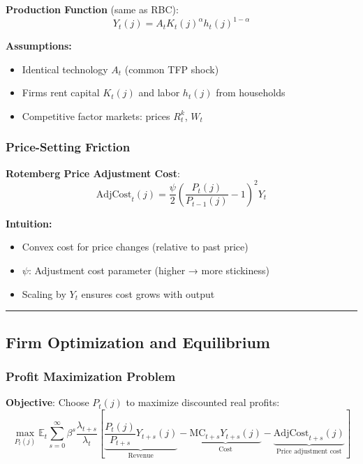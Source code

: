 \documentclass[11pt,preprint]{elsarticle}
\numberwithin{equation}{section}
\numberwithin{figure}{section}
\numberwithin{table}{section}
\def\tightlist{} %
\begin{document}
\textbf{Production Function} (same as RBC): \[
Y_t(j) = A_t K_t(j)^\alpha h_t(j)^{1-\alpha}
\]

\textbf{Assumptions:}

\begin{itemize}
\tightlist
\item
  Identical technology \(A_t\) (common TFP shock)
\item
  Firms rent capital \(K_t(j)\) and labor \(h_t(j)\) from households
\item
  Competitive factor markets: prices \(R_t^k\), \(W_t\)
\end{itemize}

\subsubsection{Price-Setting Friction}\label{price-setting-friction}

\textbf{Rotemberg Price Adjustment Cost}: \[
\text{AdjCost}_t(j) = \frac{\psi}{2} \left( \frac{P_t(j)}{P_{t-1}(j)} - 1 \right)^2 Y_t
\]

\textbf{Intuition:}

\begin{itemize}
\tightlist
\item
  Convex cost for price changes (relative to past price)
\item
  \(\psi\): Adjustment cost parameter (higher → more stickiness)
\item
  Scaling by \(Y_t\) ensures cost grows with output
\end{itemize}

\begin{center}\rule{0.5\linewidth}{0.5pt}\end{center}

\subsection{Firm Optimization and
Equilibrium}\label{firm-optimization-and-equilibrium}

\subsubsection{Profit Maximization
Problem}\label{profit-maximization-problem}

\textbf{Objective}: Choose \(P_t(j)\) to maximize discounted real
profits: \[
\max_{P_t(j)} \mathbb{E}_t \sum_{s=0}^\infty \beta^s \frac{\lambda_{t+s}}{\lambda_t} \left[
\underbrace{\frac{P_t(j)}{P_{t+s}} Y_{t+s}(j)}_{\text{Revenue}} - 
\underbrace{\text{MC}_{t+s} Y_{t+s}(j)}_{\text{Cost}} - 
\underbrace{\text{AdjCost}_{t+s}(j)}_{\text{Price adjustment cost}}
\right]
\]
\end{document}
